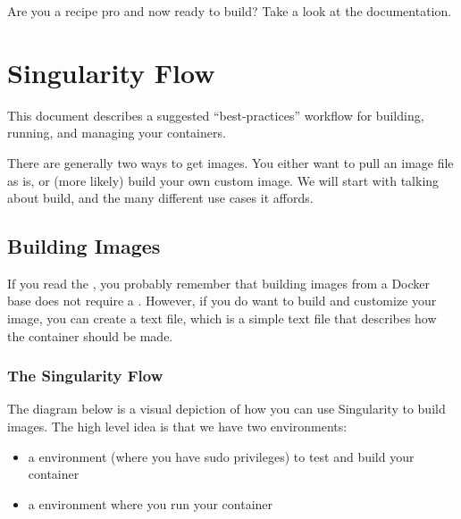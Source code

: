 \documentclass[letterpaper,10pt,english]{sphinxmanual}
\begin{document}
Are you a recipe pro and now ready to build? Take a look at the
 documentation.


\chapter{Singularity Flow}
\label{\detokenize{singularity_flow:singularity-flow}}\label{\detokenize{singularity_flow:id1}}\label{\detokenize{singularity_flow::doc}}
This document describes a suggested “best-practices” workflow for
building, running, and managing your containers.

There are generally two ways to get images. You either want to pull an
image file as is, or (more likely) build your own custom image. We
will start with talking about build, and the many different use cases
it affords.


\section{Building Images}
\label{\detokenize{singularity_flow:building-images}}\label{\detokenize{singularity_flow:sec-singularityflow}}
If you read the , you probably remember that building images from a
Docker base does not require a . However, if you do want to build and
customize your image, you can create a  text file, which is a simple
text file that describes how the container should be made.


\subsection{The Singularity Flow}
\label{\detokenize{singularity_flow:the-singularity-flow}}
The diagram below is a visual depiction of how you can use Singularity
to build images. The high level idea is that we have two environments:
\begin{itemize}
\item {} 
a  environment (where you have sudo privileges) to test and
build your container

\item {} 
a  environment where you run your container

\end{itemize}
\end{document}

